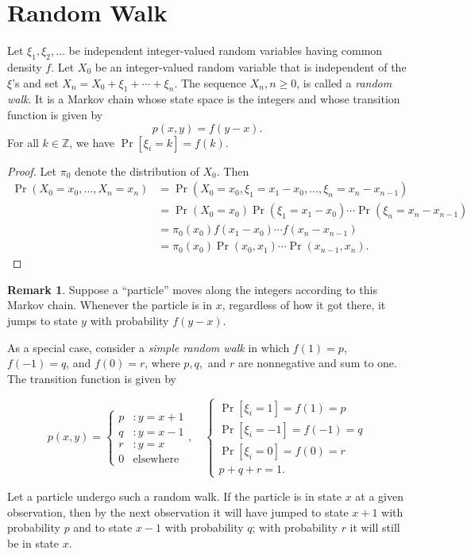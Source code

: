 \documentclass[12pt,openany]{book}
\theoremstyle{definition}
\newtheorem{remark}{Remark}[chapter]
\begin{document}
	\section{Random Walk}
	Let \(\xi_1, \xi_2, \ldots\) be independent integer-valued random variables having common density \(f\). Let \(X_0\) be an integer-valued random variable that is independent of the \(\xi\)'s and set \(X_n = X_0 + \xi_1 + \cdots + \xi_n\). The sequence \(X_n, n \geq 0\), is called a \textit{random walk}. It is a Markov chain whose state space is the integers and whose transition function is given by 
	\[
	p(x,y) = f(y-x).
	\]
	For all \( k \in \mathbb{Z} \), we have \( \Pr[\xi_i = k] = f(k) \).
	
	\begin{proof}
		Let \(\pi_0\) denote the distribution of \(X_0\). Then 
		\begin{align*}
			\Pr(X_0 = x_0, \ldots, X_n = x_n) & = \Pr(X_0 = x_0, \xi_1 = x_1 - x_0, \ldots, \xi_n = x_n - x_{n-1}) \\
			& = \Pr(X_0 = x_0)\Pr(\xi_1 = x_1 - x_0) \cdots \Pr(\xi_n = x_n - x_{n-1}) \\
			& = \pi_0(x_0)f(x_1 - x_0) \cdots f(x_n - x_{n-1}) \\
			& = \pi_0(x_0)\Pr(x_0, x_1) \cdots \Pr(x_{n-1}, x_n).
		\end{align*}
	\end{proof}
	
	\begin{remark}
		Suppose a ``particle'' moves along the integers according to this Markov chain. Whenever the particle is in \( x \), regardless of how it got there, it jumps to state \( y \) with probability \( f(y - x) \).
		
		As a special case, consider a \textit{simple random walk} in which \( f(1) = p \), \( f(-1) = q \), and \( f(0) = r \), where \( p, q, \) and \( r \) are nonnegative and sum to one. The transition function is given by
		
		\[
		p(x,y)=\begin{cases}
			p &:y=x+1\\
			q &:y=x-1\\
			r &:y=x\\
			0 &\text{elsewhere}
		\end{cases},\quad\begin{cases}
		\Pr[\xi_i=1]=f(1)=p\\
		\Pr[\xi_i=-1]=f(-1)=q\\
		\Pr[\xi_i=0]=f(0)=r\\
		p+q+r=1.
	\end{cases}
		\]
		
		Let a particle undergo such a random walk. If the particle is in state \( x \) at a given observation, then by the next observation it will have jumped to state \( x + 1 \) with probability \( p \) and to state \( x - 1 \) with probability \( q \); with probability \( r \) it will still be in state \( x \).
	\end{remark}
	
\end{document}
